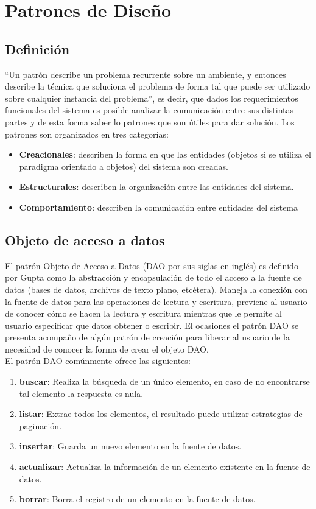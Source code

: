 \chapter{Patrones de Diseño}

\section{Definición}
``Un patrón describe un problema recurrente sobre un ambiente, y entonces describe la técnica que soluciona el problema de forma tal que puede ser utilizado sobre cualquier instancia del problema''\cite{DesignPatterns}, es decir, que dados los requerimientos funcionales del sistema es posible analizar la comunicación entre sus distintas partes y de esta forma saber lo patrones que son útiles para dar solución. Los patrones son organizados en tres categorías\cite{DesignPatterns}:
\begin{itemize}
	\item \textbf{Creacionales}: describen la forma en que las entidades (objetos si se utiliza el paradigma orientado a objetos) del sistema son creadas.
	\item \textbf{Estructurales}: describen la organización entre las entidades del sistema.
	\item \textbf{Comportamiento}: describen la comunicación entre entidades del sistema
\end{itemize}

\section{Objeto de acceso a datos}\label{sec-dao}

El patrón Objeto de Acceso a Datos (DAO por sus siglas en inglés) es definido por Gupta\cite{OCPJavaSE7} como la abstracción y encapsulación de todo el acceso a la fuente de datos (bases de datos, archivos de texto plano, etcétera). Maneja la conexión con la fuente de datos para las operaciones de lectura y escritura, previene al usuario de conocer cómo se hacen la lectura y escritura mientras que le permite al usuario especificar que datos obtener o escribir.
El ocasiones el patrón DAO se presenta acompaño de algún patrón de creación para liberar al usuario de la necesidad de conocer la forma de crear el objeto DAO.\\
El patrón DAO comúnmente ofrece las siguientes\cite{OCPJavaSE7, OCAPJavaSE7}:
\begin{enumerate}
	\item [] \textbf{buscar}: Realiza la búsqueda de un único elemento, en caso de no encontrarse tal elemento la respuesta es nula.
	\item [] \textbf{listar}: Extrae todos los elementos, el resultado puede utilizar estrategias de paginación.
	\item [] \textbf{insertar}: Guarda un nuevo elemento en la fuente de datos.
	\item [] \textbf{actualizar}: Actualiza la información de un elemento existente en la fuente de datos.
	\item [] \textbf{borrar}: Borra el registro de un elemento en la fuente de datos.
\end{enumerate}


